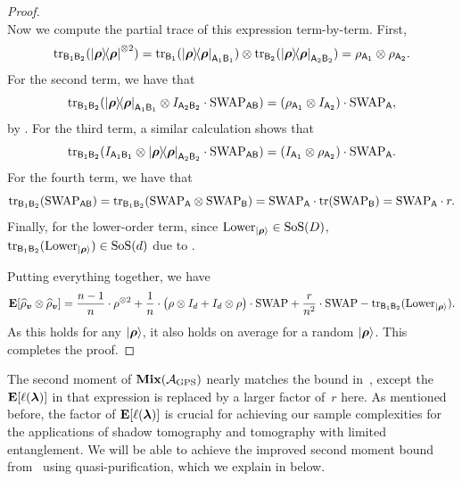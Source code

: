\documentclass{article}
\newcommand{\mixed}{\textup{\textbf{Mix}}}
\newcommand{\symsep}{\mathrm{SoS}}
\newcommand{\swap}{\mathrm{SWAP}}
\newcommand{\reg}[1]{\mathsf{#1}}
\begin{document}
\begin{proof}
\begin{equation*}
\end{equation*}
Now we compute the partial trace of this expression term-by-term.
First,
\begin{equation*}
\tr_{\reg{B}_1\reg{B}_2}(\ketbra{\brho}^{\otimes 2})
= \tr_{\reg{B}_1}(\ketbra{\brho}_{\reg{A}_1\reg{B}_1}) \otimes \tr_{\reg{B}_2}(\ketbra{\brho}_{\reg{A}_2\reg{B}_2})
= \rho_{\reg{A}_1} \otimes \rho_{\reg{A}_2}.
\end{equation*}
For the second term, we have that
\begin{equation*}
    \tr_{\reg{B}_1\reg{B}_2}(\ketbra{\brho}_{\reg{A}_1\reg{B}_1} \otimes I_{\reg{A}_2\reg{B}_2} \cdot \swap_{\reg{A}\reg{B}})
    = (\rho_{\reg{A}_1} \otimes I_{\reg{A}_2}) \cdot \swap_{\reg{A}},
\end{equation*}
by .
For the third term, a similar calculation shows that
\begin{equation*}
    \tr_{\reg{B}_1\reg{B}_2}(I_{\reg{A}_1\reg{B}_1} \otimes \ketbra{\brho}_{\reg{A}_2\reg{B}_2}  \cdot \swap_{\reg{A}\reg{B}})
    = (I_{\reg{A}_1} \otimes \rho_{\reg{A}_2}) \cdot \swap_{\reg{A}}.
\end{equation*}
For the fourth term, we have that
\begin{equation*}
    \tr_{\reg{B}_1 \reg{B}_2}(\swap_{\reg{A} \reg{B}})
    = \tr_{\reg{B}_1 \reg{B}_2}(\swap_{\reg{A}} \otimes \swap_{\reg{B}})
    = \swap_{\reg{A}} \cdot \tr(\swap_{\reg{B}})
    = \swap_{\reg{A}} \cdot r.
\end{equation*}
Finally, for the lower-order term,
since $\mathrm{Lower}_{\ket{\brho}} \in \symsep(D)$,
 $\tr_{\reg{B}_1 \reg{B}_2}(\mathrm{Lower}_{\ket{\brho}}) \in \symsep(d)$
 due to .

Putting everything together, we have
\begin{equation*}
    \E[\widehat{\rho}_{\bv}\otimes \widehat{\rho}_{\bv}] = \frac{n-1}{n} \cdot \rho^{\otimes 2} + \frac{1}{n} \cdot \big(\rho \otimes I_d + I_d \otimes \rho\big) \cdot \swap + \frac{r}{n^2} \cdot \swap-\tr_{\reg{B}_1 \reg{B}_2}(\mathrm{Lower}_{\ket{\brho}}).
    \end{equation*}
As this holds for any $\ket{\boldsymbol{\rho}}$,
it also holds on average for a random $\ket{\boldsymbol{\rho}}$.
This completes the proof.
\end{proof}

The second moment of $\mixed(\calA_{\mathrm{GPS}})$ nearly matches the bound in~, except the $\mathop{\bf E\/}[\ell(\boldsymbol{\lambda})]$ in that expression is replaced by a larger factor of~$r$ here.
As mentioned before, the factor of $\mathop{\bf E\/}[\ell(\boldsymbol{\lambda})]$ is crucial for achieving our sample complexities for the applications of shadow tomography and tomography with limited entanglement.
We will be able to achieve the improved second moment bound from~ using quasi-purification,
which we explain in  below.
\end{document}
